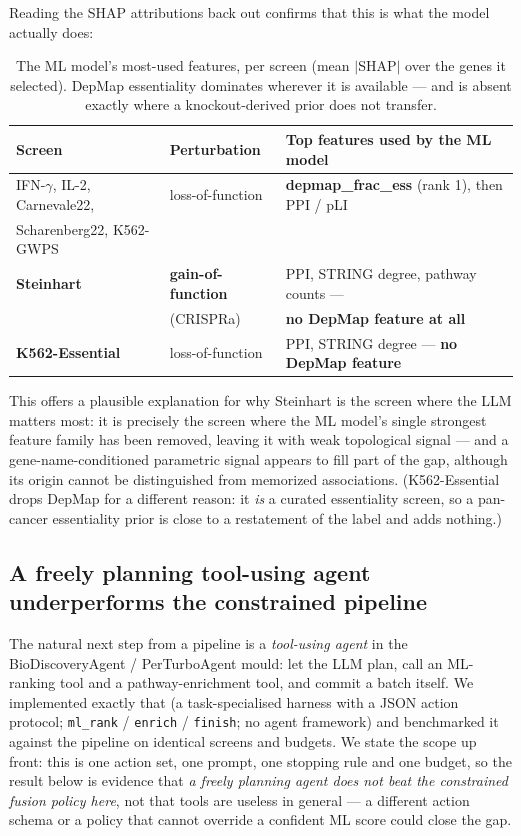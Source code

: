 \documentclass[11pt]{article}
\begin{document}
Reading the SHAP attributions back out confirms that this is what the model actually does:

\begin{table}[H]
\centering
\caption{The ML model's most-used features, per screen (mean $|$SHAP$|$ over the genes it selected).
DepMap essentiality dominates wherever it is available --- and is absent exactly where a
knockout-derived prior does not transfer.}
\label{tab:shap}
\small
\setlength{\tabcolsep}{6pt}
\begin{tabular}{lll}
\toprule
Screen & Perturbation & Top features used by the ML model \\
\midrule
IFN-$\gamma$, IL-2, Carnevale22, & loss-of-function & \textbf{depmap\_frac\_ess} (rank 1), then PPI / pLI \\
Scharenberg22, K562-GWPS & & \\
\midrule
\textbf{Steinhart} & \textbf{gain-of-function} & PPI, STRING degree, pathway counts --- \\
 & (CRISPRa) & \textbf{no DepMap feature at all} \\
\textbf{K562-Essential} & loss-of-function & PPI, STRING degree --- \textbf{no DepMap feature} \\
\bottomrule
\end{tabular}
\end{table}

\noindent
This offers a plausible explanation for why Steinhart is the screen where the LLM matters most: it is
precisely the screen where the ML model's single strongest feature family has been removed, leaving it with
weak topological signal --- and a gene-name-conditioned parametric signal appears to fill part of the gap,
although its origin cannot be distinguished from memorized associations.
(K562-Essential drops DepMap for a different reason: it \emph{is} a curated essentiality screen, so a
pan-cancer essentiality prior is close to a restatement of the label and adds nothing.)

\subsection*{A freely planning tool-using agent underperforms the constrained pipeline}

The natural next step from a pipeline is a \emph{tool-using agent} in the BioDiscoveryAgent /
PerTurboAgent mould: let the LLM plan, call an ML-ranking tool and a pathway-enrichment tool, and
commit a batch itself. We implemented exactly that (a task-specialised harness with a JSON action
protocol; \texttt{ml\_rank} / \texttt{enrich} / \texttt{finish}; no agent framework) and benchmarked
it against the pipeline on identical screens and budgets. We state the scope up front: this is one
action set, one prompt, one stopping rule and one budget, so the result below is evidence that \emph{a
freely planning agent does not beat the constrained fusion policy here}, not that tools are useless in
general --- a different action schema or a policy that cannot override a confident ML score could
close the gap.
\end{document}

